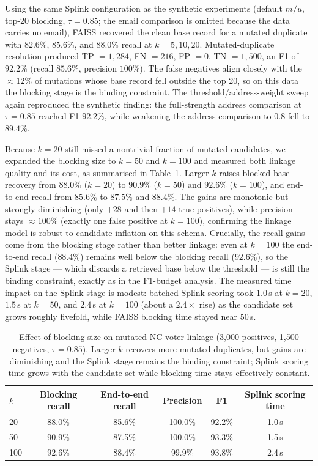\documentclass[conference]{IEEEtran}
\begin{document}
Using the same Splink configuration as the synthetic experiments (default $m/u$, top-20 blocking, $\tau=0.85$; the email comparison is omitted because the data carries no email), FAISS recovered the clean base record for a mutated duplicate with $82.6\%$, $85.6\%$, and $88.0\%$ recall at $k=5,10,20$. Mutated-duplicate resolution produced TP $=1{,}284$, FN $=216$, FP $=0$, TN $=1{,}500$, an F1 of $92.2\%$ (recall $85.6\%$, precision $100\%$). The false negatives align closely with the $\approx 12\%$ of mutations whose base record fell outside the top 20, so on this data the blocking stage is the binding constraint. The threshold/address-weight sweep again reproduced the synthetic finding: the full-strength address comparison at $\tau=0.85$ reached F1 $92.2\%$, while weakening the address comparison to 0.8 fell to $89.4\%$.

Because $k=20$ still missed a nontrivial fraction of mutated candidates, we expanded the blocking size to $k=50$ and $k=100$ and measured both linkage quality and its cost, as summarised in Table~\ref{tab:ncvoter-k}. Larger $k$ raises blocked-base recovery from $88.0\%$ ($k=20$) to $90.9\%$ ($k=50$) and $92.6\%$ ($k=100$), and end-to-end recall from $85.6\%$ to $87.5\%$ and $88.4\%$. The gains are monotonic but strongly diminishing (only $+28$ and then $+14$ true positives), while precision stays $\approx 100\%$ (exactly one false positive at $k=100$), confirming the linkage model is robust to candidate inflation on this schema. Crucially, the recall gains come from the blocking stage rather than better linkage: even at $k=100$ the end-to-end recall ($88.4\%$) remains well below the blocking recall ($92.6\%$), so the Splink stage --- which discards a retrieved base below the threshold --- is still the binding constraint, exactly as in the F1-budget analysis. The measured time impact on the Splink stage is modest: batched Splink scoring took $1.0$\,s at $k=20$, $1.5$\,s at $k=50$, and $2.4$\,s at $k=100$ (about a $2.4\times$ rise) as the candidate set grows roughly fivefold, while FAISS blocking time stayed near $50$\,s.

\begin{table}[t]
\centering
\caption{Effect of blocking size on mutated NC-voter linkage (3{,}000 positives, 1{,}500 negatives, $\tau=0.85$). Larger $k$ recovers more mutated duplicates, but gains are diminishing and the Splink stage remains the binding constraint; Splink scoring time grows with the candidate set while blocking time stays effectively constant.}
\label{tab:ncvoter-k}
\begin{tabular}{lccccc}
\toprule
$k$ & Blocking recall & End-to-end recall & Precision & F1 & Splink scoring time \\
\midrule
20 & 88.0\% & 85.6\% & 100.0\% & 92.2\% & 1.0\,s \\
50 & 90.9\% & 87.5\% & 100.0\% & 93.3\% & 1.5\,s \\
100 & 92.6\% & 88.4\% & 99.9\% & 93.8\% & 2.4\,s \\
\bottomrule
\end{tabular}
\end{table}
\end{document}

